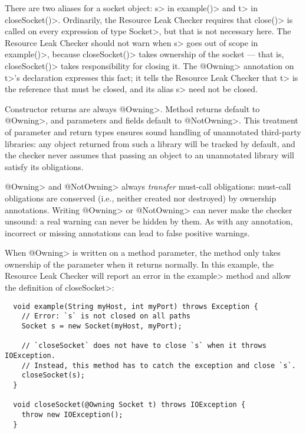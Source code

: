 There are two aliases for a socket object: \<s> in \<example()> and \<t> in
\<closeSocket()>.  Ordinarily, the Resource Leak Checker requires that
\<close()> is called on every expression of type \<Socket>, but that is not
necessary here.  The Resource Leak Checker should not warn when
\<s> goes out of scope in \<example()>, because \<closeSocket()> takes ownership
of the socket --- that is, \<closeSocket()> takes responsibility for closing
it. The \<@Owning> annotation on \<t>'s declaration expresses this fact; it
tells the Resource Leak Checker that \<t> is the reference that must be
closed, and its alias \<s> need not be closed.

Constructor returns are always \<@Owning>.
Method returns default to \<@Owning>,
and parameters and fields default to \<@NotOwning>. This treatment of parameter and
return types ensures sound handling of unannotated third-party libraries: any
object returned from such a library will be tracked by default, and the checker
never assumes that passing an object to an unannotated library will satisfy its obligations.

\<@Owning> and \<@NotOwning> always \emph{transfer} must-call obligations: must-call
obligations are conserved (i.e., neither created nor destroyed) by ownership annotations.
Writing \<@Owning> or \<@NotOwning> can never make the checker
unsound:  a real warning can never be hidden by them.
As with any annotation, incorrect or missing annotations can lead to false positive warnings.

When \<@Owning> is written on a method parameter, the method only takes ownership of the
parameter when it returns normally.  In this example, the Resource Leak Checker will report
an error in the \<example> method and allow the definition of \<closeSocket>:

\begin{verbatim}
  void example(String myHost, int myPort) throws Exception {
    // Error: `s` is not closed on all paths
    Socket s = new Socket(myHost, myPort);

    // `closeSocket` does not have to close `s` when it throws IOException.
    // Instead, this method has to catch the exception and close `s`.
    closeSocket(s);
  }

  void closeSocket(@Owning Socket t) throws IOException {
    throw new IOException();
  }
\end{verbatim}



